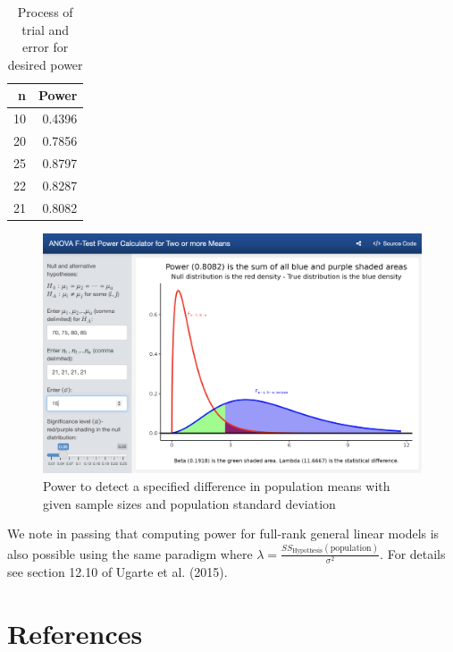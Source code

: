 \documentclass[
]{article}
\begin{document}
\begin{table}

\caption{\label{tab:unnamed-chunk-6}Process of trial and error for desired power}
\centering
\begin{tabular}[t]{rr}
\toprule
n & Power\\
\midrule
10 & 0.4396\\
20 & 0.7856\\
25 & 0.8797\\
22 & 0.8287\\
21 & 0.8082\\
\bottomrule
\end{tabular}
\end{table}

\begin{figure}

{\centering \includegraphics[width=5.86in]{./pics/fig-power4} 

}

\caption{Power to detect a specified difference in population means with given sample sizes and population standard deviation}\label{fig:power4}
\end{figure}

We note in passing that computing power for full-rank general linear models is also possible using the same paradigm where \(\lambda = \frac{SS_\text{Hypothesis}(\text{population})}{\sigma^2}\). For details see section 12.10 of Ugarte et al. (2015).

\hypertarget{references}{%
\section*{References}\label{references}}
\end{document}
